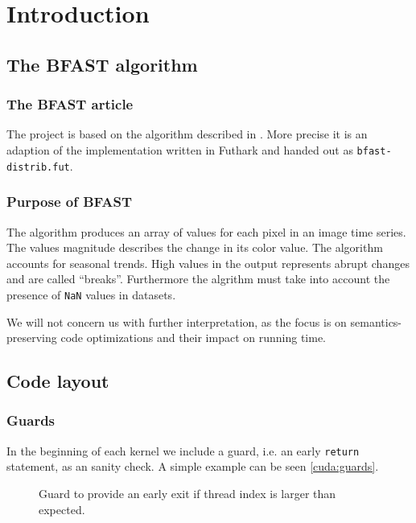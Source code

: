 \section{Introduction}

\subsection{The \textsc{BFAST} algorithm}
\subsubsection{The \textsc{BFAST} article}
The project is based on the algorithm described in \cite{bfast}. More precise it
is an adaption of the implementation written in Futhark and handed out as
\texttt{bfast-distrib.fut}.

\subsubsection{Purpose of \textsc{BFAST}}
The algorithm produces an array of values for each pixel in an image time
series. The values magnitude describes the change in its color value. The algorithm accounts
for seasonal trends. High values in the output represents abrupt changes and are
called \enquote{breaks}.
Furthermore the algrithm must take into account the presence of \texttt{NaN}
values in datasets.

We will not concern us with further interpretation, as the focus is on
semantics-preserving code optimizations and their impact on running time.

\subsection{Code layout}

\subsubsection{Guards} In the beginning of each kernel we include a guard, i.e.
an early \texttt{return} statement, as an sanity check. A simple example can be
seen \autoref{cuda:guards}.

\begin{figure}[H]
    \centering
    \caption{Guard to provide an early exit if thread index is larger than expected.}
    \label{cuda:guards}
\end{figure}


